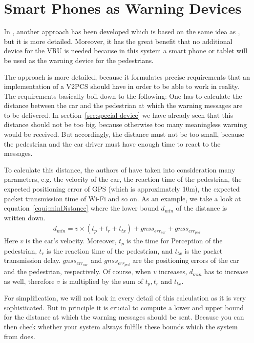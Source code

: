 \documentclass[]{ccs-thesis}
\begin{document}
\section{Smart Phones as Warning Devices}\label{sec:smartphone}

In \cite{v2pcomm}, another approach has been developed which is based on the same idea as \cite{v2pprotection}, but it is more detailed. Moreover, it has the great benefit that no additional device for the \ac{VRU} is needed because in this system a smart phone or tablet will be used as the warning device for the pedestrians.

The approach is more detailed, because it formulates precise requirements that an implementation of a \ac{V2PCS} should have in order to be able to work in reality. The  requirements basically boil down to the following: One has to calculate the distance between the car and the pedestrian at which the warning messages are to be delivered. In section~\ref{sec:special device} we have already seen that this distance should not be too big, because otherwise too many meaningless warning would be received. But accordingly, the distance must not be too small, because the pedestrian and the car driver must have enough time to react to the messages.

To calculate this distance, the authors of \cite{v2pcomm} have taken into consideration many parameters, e.g. the velocity of the car, the reaction time of the pedestrian, the expected positioning error of GPS (which is approximately 10m), the expected packet transmission time of Wi-Fi and so on. As an example, we take a look at equation~\ref{equi:minDistance} where the lower bound $d_{min}$ of the distance is written down.
\begin{align}
d_{min}=v \times (t_p+t_r+t_{tx})+gnss_{err_{car}}+gnss_{err_{ped}}\label{equi:minDistance}
\end{align}
Here $v$ is the car's velocity. Moreover, $t_p$ is the time for Perception of the pedestrian, $t_r$ is the reaction time of the pedestrian, and $t_{tx}$ is the packet transmission delay. $gnss_{err_{car}}$ and $gnss_{err_{ped}}$ are the positioning errors of the car and the pedestrian, respectively. Of course, when $v$ increases, $d_{min}$ has to increase as well, therefore $v$ is multiplied by the sum of $t_p, t_r$ and $t_{tx}$.

For simplification, we will not look in every detail of this calculation as it is very sophisticated. But in principle it is crucial to compute a lower and upper bound for the distance at which the warning messages should be sent. Because you can then check whether your system always fulfills these bounds which the system from \cite{v2pcomm} does.
\end{document}
